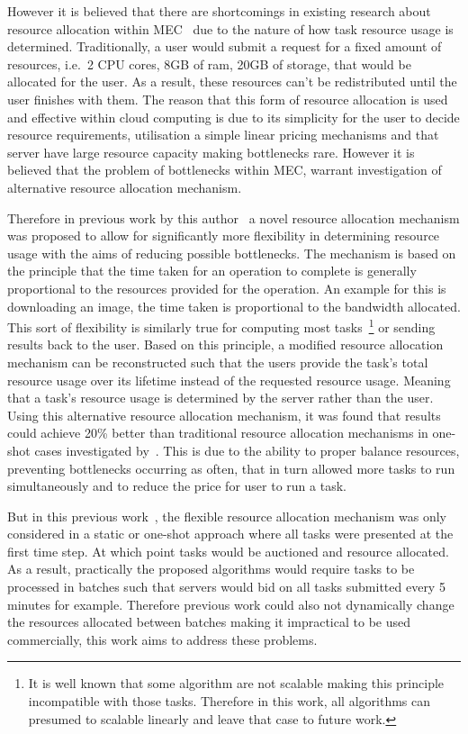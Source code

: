 However it is believed that there are shortcomings in existing research about resource allocation within
MEC~\citep{vaji_infocom, Bi2019} due to the nature of how task resource usage is determined. Traditionally,
a user would submit a request for a fixed amount of resources, i.e.\ 2 CPU cores, 8GB of ram, 20GB of storage, that
would be allocated for the user. As a result, these resources can't be redistributed until the user finishes with them.
The reason that this form of resource allocation is used and effective within cloud computing is due to its simplicity
for the user to decide resource requirements, utilisation a simple linear pricing mechanisms and that server have large
resource capacity making bottlenecks rare. However it is believed that the problem of bottlenecks within MEC, warrant
investigation of alternative resource allocation mechanism.

Therefore in previous work by this author~\citep{FlexibleResourceAllocation} a novel resource allocation mechanism was
proposed to allow for significantly more flexibility in determining resource usage with the aims of reducing possible
bottlenecks. The mechanism is based on the principle that the time taken for an operation to complete is generally
proportional to the resources provided for the operation. An example for this is downloading an image, the time taken
is proportional to the bandwidth allocated. This sort of flexibility is similarly true for computing most
tasks~\footnote{It is well known that some algorithm are not scalable making this principle incompatible with those
tasks. Therefore in this work, all algorithms can presumed to scalable linearly and leave that case to future work.}
or sending results back to the user. Based on this principle, a modified resource allocation mechanism can be
reconstructed such that the users provide the task's total resource usage over its lifetime instead of the requested
resource usage. Meaning that a task's resource usage is determined by the server rather than the user. Using this
alternative resource allocation mechanism, it was found that results could achieve 20\% better than traditional
resource allocation mechanisms in one-shot cases investigated by~\cite{FlexibleResourceAllocation}. This is due to the
ability to proper balance resources, preventing bottlenecks occurring as often, that in turn allowed more tasks to
run simultaneously and to reduce the price for user to run a task.

But in this previous work~\citep{FlexibleResourceAllocation}, the flexible resource allocation mechanism was only
considered in a static or one-shot approach where all tasks were presented at the first time step. At which point tasks
would be auctioned and resource allocated. As a result, practically the proposed algorithms would require tasks to
be processed in batches such that servers would bid on all tasks submitted every 5 minutes for example. Therefore
previous work could also not dynamically change the resources allocated between batches making it impractical to be
used commercially, this work aims to address these problems.

